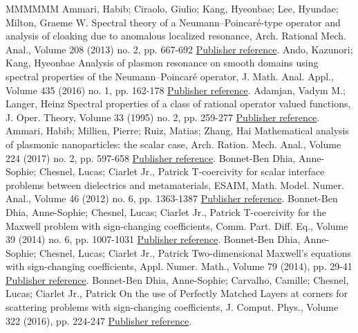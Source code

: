 \begin{thebibliography}{MMMMMM}
 Ammari, Habib; Ciraolo, Giulio; Kang, Hyeonbae; Lee, Hyundae; Milton, Graeme W. Spectral theory of a Neumann–Poincaré-type operator and analysis of cloaking due to anomalous localized resonance, Arch. Rational Mech. Anal., Volume 208 (2013) no. 2, pp. 667-692 \href{https://ahl.centre-mersenne.org/item/AHL_2020__3__1161_0/#Amm-etal-13}{Publisher reference}.
 Ando, Kazunori; Kang, Hyeonbae Analysis of plasmon resonance on smooth domains using spectral properties of the Neumann–Poincaré operator, J. Math. Anal. Appl., Volume 435 (2016) no. 1, pp. 162-178 \href{https://ahl.centre-mersenne.org/item/AHL_2020__3__1161_0/#And-Kan-16}{Publisher reference}.
 Adamjan, Vadym M.; Langer, Heinz Spectral properties of a class of rational operator valued functions, J. Oper. Theory, Volume 33 (1995) no. 2, pp. 259-277 \href{https://ahl.centre-mersenne.org/item/AHL_2020__3__1161_0/#Ada-Lan-95}{Publisher reference}.
 Ammari, Habib; Millien, Pierre; Ruiz, Matias; Zhang, Hai Mathematical analysis of plasmonic nanoparticles: the scalar case, Arch. Ration. Mech. Anal., Volume 224 (2017) no. 2, pp. 597-658 \href{https://ahl.centre-mersenne.org/item/AHL_2020__3__1161_0/#Amm-Mil-Rui-Zha-17}{Publisher reference}.
 Bonnet-Ben Dhia, Anne-Sophie; Chesnel, Lucas; Ciarlet Jr., Patrick T-coercivity for scalar interface problems between dielectrics and metamaterials, ESAIM, Math. Model. Numer. Anal., Volume 46 (2012) no. 6, pp. 1363-1387 \href{https://ahl.centre-mersenne.org/item/AHL_2020__3__1161_0/#Bon-Che-Cia-12}{Publisher reference}.
 Bonnet-Ben Dhia, Anne-Sophie; Chesnel, Lucas; Ciarlet Jr., Patrick T-coercivity for the Maxwell problem with sign-changing coefficients, Comm. Part. Diff. Eq., Volume 39 (2014) no. 6, pp. 1007-1031 \href{https://ahl.centre-mersenne.org/item/AHL_2020__3__1161_0/#Bon-Che-Cia-14a}{Publisher reference}.
 Bonnet-Ben Dhia, Anne-Sophie; Chesnel, Lucas; Ciarlet Jr., Patrick Two-dimensional Maxwell’s equations with sign-changing coefficients, Appl. Numer. Math., Volume 79 (2014), pp. 29-41 \href{https://ahl.centre-mersenne.org/item/AHL_2020__3__1161_0/#Bon-Che-Cia-14b}{Publisher reference}.
 Bonnet-Ben Dhia, Anne-Sophie; Carvalho, Camille; Chesnel, Lucas; Ciarlet Jr., Patrick On the use of Perfectly Matched Layers at corners for scattering problems with sign-changing coefficients, J. Comput. Phys., Volume 322 (2016), pp. 224-247 \href{https://ahl.centre-mersenne.org/item/AHL_2020__3__1161_0/#Bon-etal-16}{Publisher reference}.

\end{thebibliography}
